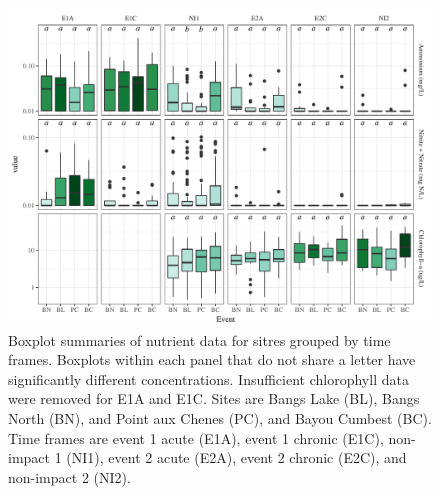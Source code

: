 \documentclass[letterpaper,12pt]{article}\usepackage[]{graphicx}\usepackage[]{color}
\makeatletter
\def\maxwidth{ %
  \ifdim\Gin@nat@width>\linewidth
    \linewidth
  \else
    \Gin@nat@width
  \fi
}
\makeatother
\begin{document}
\begin{figure}[!ht]

{\centering \includegraphics[width=\maxwidth]{figs/FigS2} 

}

\caption[Boxplot summaries of nutrient data for sitres grouped by time frames]{Boxplot summaries of nutrient data for sitres grouped by time frames. Boxplots within each panel that do not share a letter have significantly different concentrations. Insufficient chlorophyll data were removed for E1A and E1C. Sites are Bangs Lake (BL), Bangs North (BN), and Point aux Chenes (PC), and Bayou Cumbest (BC).  Time frames are event 1 acute (E1A), event 1 chronic (E1C), non-impact 1 (NI1), event 2 acute (E2A), event 2 chronic (E2C), and non-impact 2 (NI2).}\label{fig:FigS2}
\end{figure}
\end{document}
